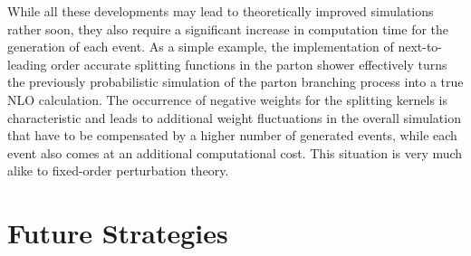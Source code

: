 \documentclass{article}
\begin{document}
While all these developments may lead to theoretically improved simulations rather soon,
they also require a significant increase in computation time for the generation
of each event. As a simple example, the implementation of next-to-leading order
accurate splitting functions in the parton shower effectively turns the previously
probabilistic simulation of the parton branching process into a true NLO
calculation. The occurrence of negative weights for the splitting kernels
is characteristic and leads to additional weight fluctuations in the overall 
simulation that have to be compensated by a higher number of generated events,
while each event also comes at an additional computational cost. This situation 
is very much alike to fixed-order perturbation theory.





\section{Future Strategies}
\end{document}
